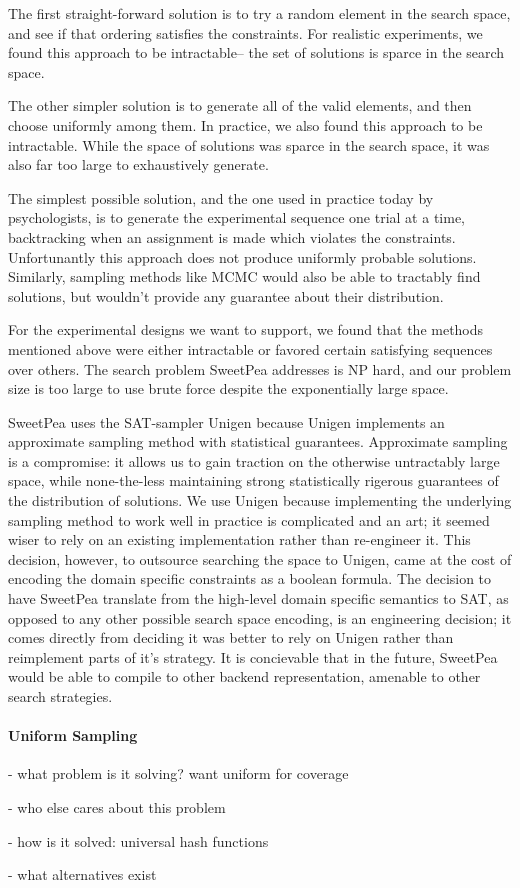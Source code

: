 The first straight-forward solution is to try a random element in the search space, and see if that ordering satisfies the constraints. For realistic experiments, we found this approach to be intractable-- the set of solutions is sparce in the search space.

The other simpler solution is to generate all of the valid elements, and then choose uniformly among them. In practice, we also found this approach to be intractable. While the space of solutions was sparce in the search space, it was also far too large to exhaustively generate.

The simplest possible solution, and the one used in practice today by psychologists, is to generate the experimental sequence one trial at a time, backtracking when an assignment is made which violates the constraints. Unfortunantly this approach does not produce uniformly probable solutions. Similarly, sampling methods like MCMC would also be able to tractably find solutions, but wouldn't provide any guarantee about their distribution.

For the experimental designs we want to support, we found that the methods mentioned above were either intractable or favored certain satisfying sequences over others. The search problem SweetPea addresses is NP hard, and our problem size is too large to use brute force despite the exponentially large space.

SweetPea uses the SAT-sampler Unigen because Unigen implements an approximate sampling method with statistical guarantees. Approximate sampling is a compromise: it allows us to gain traction on the otherwise untractably large space, while none-the-less maintaining strong statistically rigerous guarantees of the distribution of solutions. We use Unigen because implementing the underlying sampling method to work well in practice is complicated and an art; it seemed wiser to rely on an existing implementation rather than re-engineer it. This decision, however, to outsource searching the space to Unigen, came at the cost of encoding the domain specific constraints as a boolean formula. The decision to have SweetPea translate from the high-level domain specific semantics to SAT, as opposed to any other possible search space encoding, is an engineering decision; it comes directly from deciding it was better to rely on Unigen rather than reimplement parts of it's strategy. It is concievable that in the future, SweetPea would be able to compile to other backend representation, amenable to other search strategies.

\paragraph*{Uniform Sampling}

\cite{meel2016constrained}

- what problem is it solving? want uniform for coverage

- who else cares about this problem

- how is it solved: universal hash functions

- what alternatives exist
